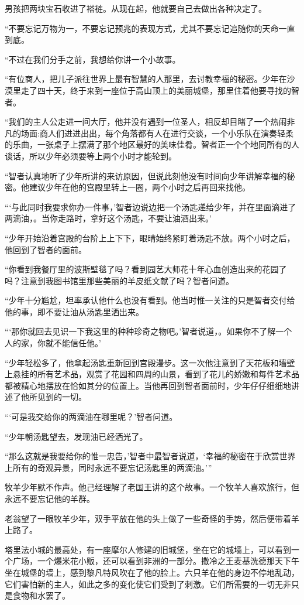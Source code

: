 \documentclass[twoside,openany]{book}
\begin{document}
男孩把两块宝石收进了褡裢。从现在起，他就要自己去做出各种决定了。

“不要忘记万物为一，不要忘记预兆的表现方式，尤其不要忘记追随你的天命一直到底。

“不过在我们分手之前，我想给你讲一个小故事。

“有位商人，把儿子派往世界上最有智慧的人那里，去讨教幸福的秘密。少年在沙漠里走了四十天，终于来到一座位于高山顶上的美丽城堡，那里住着他要寻找的智者。

“我们的主人公走进一间大厅，他并没有遇到一位圣人，相反却目睹了一个热闹非凡的场面:商人们进进出出，每个角落都有人在进行交谈，一个小乐队在演奏轻柔的乐曲，一张桌子上摆满了那个地区最好的美味佳肴。智者正一个个地同所有的人谈话，所以少年必须要等上两个小时才能轮到。

“智者认真地听了少年所讲的来访原因，但说此刻他没有时间向少年讲解幸福的秘密。他建议少年在他的宫殿里转上一圈，两个小时之后再回来找他。

“‘与此同时我要求你办一件事，'智者边说边把一个汤匙递给少年，并在里面滴进了两滴油，。当你走路时，拿好这个汤匙，不要让油酒出来。'

“少年开始沿着宫殿的台阶上上下下，眼晴始终紧盯着汤匙不放。两个小时之后，他回到了智者的面前。

“你看到我餐厅里的波斯壁毯了吗？看到园艺大师花十年心血创造出来的花园了吗？注意到我图书馆里那些美丽的羊皮纸文献了吗？智者问道。

“少年十分尴尬，坦率承认他什么也没有看到。他当时惟一关注的只是智者交付给他的事，即不要让油从汤匙里洒出来。

“‘那你就回去见识一下我这里的种种珍奇之物吧。'智者说道，。如果你不了解一个人的家，你就不能信任他。'

“少年轻松多了，他拿起汤匙重新回到宫殿漫步。这一次他注意到了天花板和墙壁上悬挂的所有艺术品，观赏了花园和四周的山景，看到了花儿的娇嫩和每件艺术品都被精心地摆放在恰如其分的位置上。当他再回到智者面前时，少年仔仔细细地讲述了他所见到的一切。

“‘可是我交给你的两滴油在哪里呢？’智者问道。

“少年朝汤匙望去，发现油已经洒光了。

“那么这就是我要给你的惟一忠告，'智者中最智者说道，‘幸福的秘密在于欣赏世界上所有的奇观异景，同时永远不要忘记汤匙里的两滴油。'”

牧羊少年默不作声。他己经理解了老国王讲的这个故事。一个牧羊人喜欢旅行，但永远不要忘记他的羊群。

老翁望了一眼牧羊少年，双手平放在他的头上做了一些奇怪的手势，然后便带着羊上路了。

塔里法小城的最高处，有一座摩尔人修建的旧城堡，坐在它的城墙上，可以看到一个广场，一个爆米花小贩，还可以看到非洲的一部分。撒冷之王麦基洗德那天下午坐在城堡的墙上，感到黎凡特风吹在了他的脸上。六只羊在他的身边不停地乱动，它们害怕新的主人，如此之多的变化使它们受到了刺激。它们所需要的一切无非只是食物和水罢了。
\end{document}
